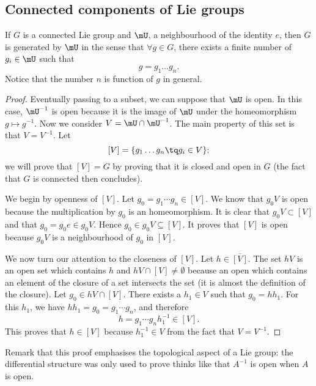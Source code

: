\subsection{Connected components of Lie groups}

\begin{proposition}		\label{PropUssGpGenere}
	If $G$ is a connected Lie group and $\mU$, a neighbourhood of the identity $e$, then $G$ is generated by $\mU$ in the sense that $\forall g\in G$, there exists a finite number of $g_{i}\in \mU$ such that
	\begin{equation}
		g=g_1\ldots g_n.
	\end{equation}
	Notice that the number $n$ is function of $g$ in general.
\end{proposition}

\begin{proof}
	Eventually passing to a subset, we can suppose that $\mU$ is open. In this case, $\mU^{-1}$ is open because it is the image of $\mU$ under the homeomorphism $g\mapsto g^{-1}$. Now we consider $V=\mU\cap\mU^{-1}$. The main property of this set is that $V=V^{-1}$. Let
	\[
		[V]=\{ g_1\ldots g_n\tq g_{i}\in V \};
	\]
	we will prove that $[V]=G$ by proving that it is closed and open in $G$ (the fact that $G$ is connected then concludes).

	We begin by openness of $[V]$. Let $g_0=g_1\cdots g_n\in[V]$. We know that $g_0V$ is open because the multiplication by $g_0$ is an homeomorphism. It is clear that $g_0V\subset [V]$ and that $g_0=g_0e\in g_0V$. Hence $g_0\in g_0V\subseteq[V]$. It proves that $[V]$ is open because $g_0V$ is a neighbourhood of $g_0$ in $[V]$.

	We now turn our attention to the closeness of $[V]$. Let $h\in\overline{ [V] }$. The set $hV$ is an open set which contains $h$ and $hV\cap [V]\neq \emptyset$ because an open which contains an element of the closure of a set intersects the set (it is almost the definition of the closure). Let $g_0\in hV\cap[V]$. There exists a $h_{1}\in V$ such that $g_0=hh_1$. For this $h_1$, we have $hh_1=g_0=g_1\cdots g_n$, and therefore
	\[
		h=g_1\cdots g_n h_1^{-1}\in[V].
	\]
	This proves that $h\in[V]$ because $h_1^{-1}\in V$ from the fact that $V=V^{-1}$.
\end{proof}
Remark that this proof emphasises the topological aspect of a Lie group: the differential structure was only used to prove thinks like that $A^{-1}$ is open when $A$ is open.

